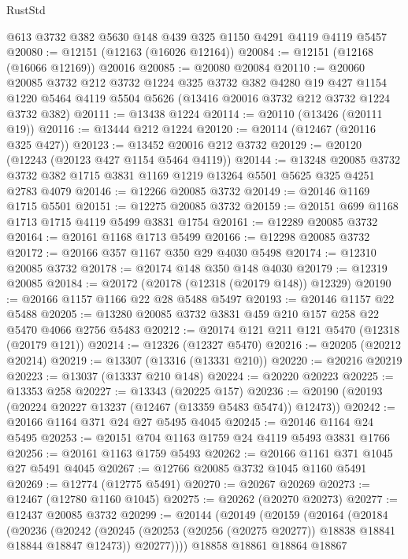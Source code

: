 \begin{lexlean}{RustStd}
\begin{coremodule}
    @613
    @3732
    @382
    @5630
    @148
    @439
    @325
    @1150
    @4291
    @4119
    @4119
    @5457
@20080 := @12151 (@12163 (@16026 @12164))
@20084 := @12151 (@12168 (@16066 @12169)) @20016
@20085 := @20080 @20084
@20110 := @20060
    @20085
    @3732
    @212
    @3732
    @1224
    @325
    @3732
    @382
    @4280
    @19
    @427
    @1154
    @1220
    @5464
    @4119
    @5504
    @5626
    (@13416 @20016 @3732 @212 @3732 @1224 @3732 @382)
@20111 := @13438 @1224
@20114 := @20110 (@13426 (@20111 @19))
@20116 := @13444 @212 @1224
@20120 := @20114 (@12467 (@20116 @325 @427))
@20123 := @13452 @20016 @212 @3732
@20129 := @20120 (@12243 (@20123 @427 @1154 @5464 @4119))
@20144 := @13248
    @20085
    @3732
    @3732
    @382
    @1715
    @3831
    @1169
    @1219
    @13264
    @5501
    @5625
    @325
    @4251
    @2783
    @4079
@20146 := @12266 @20085 @3732
@20149 := @20146 @1169 @1715 @5501
@20151 := @12275 @20085 @3732
@20159 := @20151 @699 @1168 @1713 @1715 @4119 @5499 @3831 @1754
@20161 := @12289 @20085 @3732
@20164 := @20161 @1168 @1713 @5499
@20166 := @12298 @20085 @3732
@20172 := @20166 @357 @1167 @350 @29 @4030 @5498
@20174 := @12310 @20085 @3732
@20178 := @20174 @148 @350 @148 @4030
@20179 := @12319 @20085
@20184 := @20172 (@20178 (@12318 (@20179 @148)) @12329)
@20190 := @20166 @1157 @1166 @22 @28 @5488 @5497
@20193 := @20146 @1157 @22 @5488
@20205 := @13280 @20085 @3732 @3831 @459 @210 @157 @258 @22 @5470 @4066 @2756 @5483
@20212 := @20174 @121 @211 @121 @5470 (@12318 (@20179 @121))
@20214 := @12326 (@12327 @5470)
@20216 := @20205 (@20212 @20214)
@20219 := @13307 (@13316 (@13331 @210))
@20220 := @20216 @20219
@20223 := @13037 (@13337 @210 @148)
@20224 := @20220 @20223
@20225 := @13353 @258
@20227 := @13343 (@20225 @157)
@20236 := @20190 (@20193 (@20224 @20227 @13237 (@12467 (@13359 @5483 @5474)) @12473))
@20242 := @20166 @1164 @371 @24 @27 @5495 @4045
@20245 := @20146 @1164 @24 @5495
@20253 := @20151 @704 @1163 @1759 @24 @4119 @5493 @3831 @1766
@20256 := @20161 @1163 @1759 @5493
@20262 := @20166 @1161 @371 @1045 @27 @5491 @4045
@20267 := @12766 @20085 @3732 @1045 @1160 @5491
@20269 := @12774 (@12775 @5491)
@20270 := @20267 @20269
@20273 := @12467 (@12780 @1160 @1045)
@20275 := @20262 (@20270 @20273)
@20277 := @12437 @20085 @3732
@20299 := @20144
    (@20149
      (@20159
        (@20164
          (@20184
            (@20236
              (@20242
                (@20245 (@20253 (@20256 (@20275 @20277)) @18838 @18841 @18844 @18847 @12473))
                @20277))))
        @18858
        @18861
        @18864
        @18867

\end{coremodule}
\end{lexlean}

